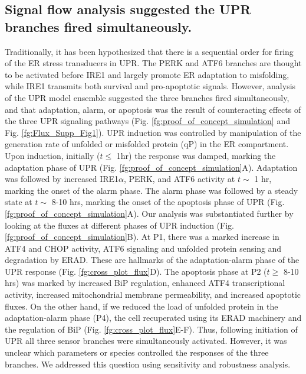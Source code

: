 \documentclass[fleqn,10pt]{wlscirep}
\begin{document}
\subsection*{Signal flow analysis suggested the UPR branches fired simultaneously.}
Traditionally, it has been hypothesized that there is a sequential order for firing of the ER stress transducers in UPR.
The PERK and ATF6 branches are thought to be activated before IRE1 \cite{szegezdi2006mediators} and largely promote ER adaptation to misfolding, while IRE1 transmits both survival and pro-apoptotic signals.
However, analysis of the UPR model ensemble suggested the three branches fired simultaneously, and that adaptation, alarm, or apoptosis was the result of counteracting effects of the three UPR signaling pathways (Fig. \ref{fg:proof_of_concept_simulation} and Fig. \ref{fg:Flux_Supp_Fig1}). UPR induction was controlled by manipulation of the generation rate of unfolded or misfolded protein (qP) in the ER compartment.
Upon induction, initially ($t\leq$ 1hr) the response was damped, marking the adaptation phase of UPR (Fig. \ref{fg:proof_of_concept_simulation}A).
Adaptation was followed by increased IRE1$\alpha$, PERK, and ATF6 activity at $t\sim$ 1 hr, marking the onset of the alarm phase.
The alarm phase was followed by a steady state at $t\sim$ 8-10 hrs, marking the onset of the apoptosis phase of UPR (Fig. \ref{fg:proof_of_concept_simulation}A).
Our analysis was substantiated further by looking at the fluxes at different phases of UPR induction (Fig. \ref{fg:proof_of_concept_simulation}B).
At P1, there was a marked increase in ATF4 and CHOP activity, ATF6 signaling and unfolded protein sensing and degradation by ERAD.
These are hallmarks of the adaptation-alarm phase of the UPR response (Fig. \ref{fg:cross_plot_flux}D).
The apoptosis phase at P2 ($t\geq$ 8-10 hrs) was marked by increased BiP regulation, enhanced ATF4 transcriptional activity, increased mitochondrial membrane permeability, and increased apoptotic fluxes.
On the other hand, if we reduced the load of unfolded protein in the adaptation-alarm phase (P4), the cell recuperated using its ERAD machinery and the regulation of BiP (Fig. \ref{fg:cross_plot_flux}E-F).
Thus, following initiation of UPR all three sensor branches were simultaneously activated. However, it was unclear which parameters or species controlled the responses of the three branches.
We addressed this question using sensitivity and robustness analysis.
\end{document}

